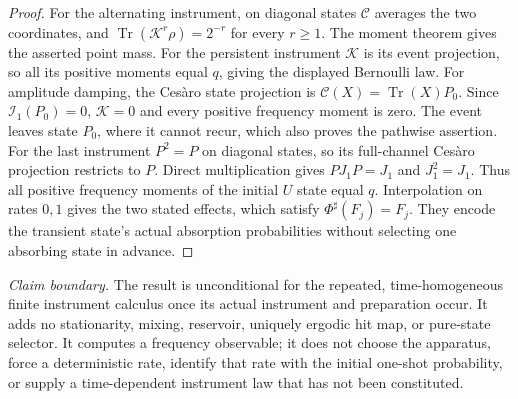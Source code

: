 \documentclass[12pt,a4paper]{article}
\begin{document}
\begin{proof}
For the alternating instrument, on diagonal states
$\mathcal C$ averages the two coordinates, and
$\operatorname{Tr}(\mathcal K^r\rho)=2^{-r}$ for every $r\ge1$.
The moment theorem gives the asserted point mass. For the persistent
instrument $\mathcal K$ is its event projection, so all its positive
moments equal $q$, giving the displayed Bernoulli law.
For amplitude damping, the Ces\`aro state projection is
$\mathcal C(X)=\operatorname{Tr}(X)P_0$. Since
$\mathcal I_1(P_0)=0$, $\mathcal K=0$ and every positive frequency
moment is zero. The event leaves state $P_0$, where it cannot recur,
which also proves the pathwise assertion.
For the last instrument $P^2=P$ on diagonal states, so its full-channel
Ces\`aro projection restricts to $P$. Direct multiplication gives
$PJ_1P=J_1$ and $J_1^2=J_1$. Thus all positive frequency moments of the
initial $U$ state equal $q$. Interpolation on rates $0,1$ gives the two
stated effects, which satisfy $\Phi^\sharp(F_j)=F_j$. They encode the
transient state's actual absorption probabilities without selecting
one absorbing state in advance.
\end{proof}

\noindent\textit{Claim boundary.}
The result is unconditional for the repeated, time-homogeneous finite
instrument calculus once its actual instrument and preparation occur.
It adds no stationarity, mixing, reservoir, uniquely ergodic hit map, or
pure-state selector. It computes a frequency observable; it does not
choose the apparatus, force a deterministic rate, identify that rate
with the initial one-shot probability, or supply a time-dependent
instrument law that has not been constituted.
\end{document}
